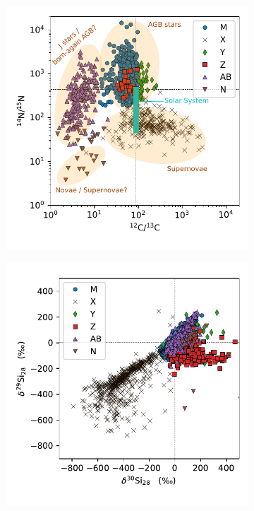 \documentclass{brandeis-thesis3.2}
\begin{document}
\begin{figure}
     \centering
     \begin{subfigure}[b]{0.45\textwidth}
         \centering
         \includegraphics[width=\textwidth]{figs/sic_n_c_all.pdf}
     \end{subfigure}
     \begin{subfigure}[b]{0.45\textwidth}
         \centering
         \includegraphics[width=\textwidth]{figs/sic_si_3iso_all.pdf}

\end{subfigure}
\end{figure}
\end{document}
